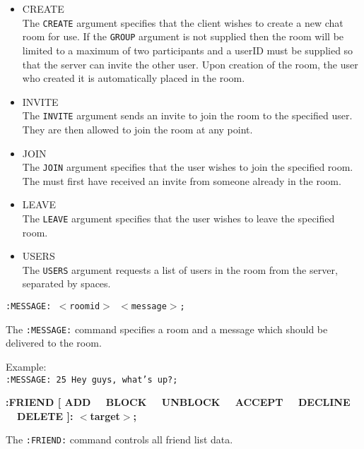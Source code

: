\begin{itemize}

\item{CREATE \\
The \texttt{CREATE} argument specifies that the client wishes to create a new chat room for use. If the \texttt{GROUP} argument is not supplied then the room will be limited to a maximum of two participants and a userID must be supplied so that the server can invite the other user. Upon creation of the room, the user who created it is automatically placed in the room.}

\item {INVITE \\
The \texttt{INVITE} argument sends an invite to join the room to the specified user. They are then allowed to join the room at any point.}

\item{JOIN \\
The \texttt{JOIN} argument specifies that the user wishes to join the specified room. The must first have received an invite from someone already in the room.}

\item{LEAVE \\
The \texttt{LEAVE} argument specifies that the user wishes to leave the specified room.}

\item{USERS \\
The \texttt{USERS} argument requests a list of users in the room from the server, separated by spaces.}

\end{itemize}

\texttt{:MESSAGE: $<$roomid$>$ $<$message$>$;}

The \texttt{:MESSAGE:} command specifies a room and a message which should be delivered to the room.

Example: \\
\texttt{:MESSAGE: 25 Hey guys, what's up?;}

{\bf :FRIEND [ ADD \ \vline \ BLOCK \ \vline \ UNBLOCK \ \vline \ ACCEPT \ \vline \ DECLINE \ \vline \ DELETE ]: $<$target$>$;}

The \texttt{:FRIEND:} command controls all friend list data.

